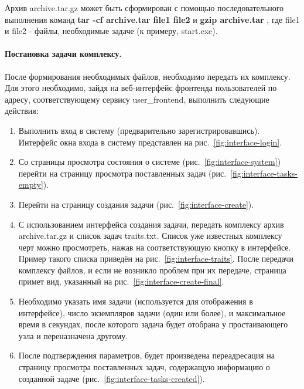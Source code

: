 \documentclass[a4paper,12pt]{report}
\numberwithin{equation}{section}
\begin{document}
  Архив archive.tar.gz может быть сформирован с помощью последовательного выполнения команд
  \textbf{ tar -cf archive.tar file1 file2 } и 
  \textbf{ gzip archive.tar }
  , где file1 и file2 - файлы, необходимые задаче (к примеру, start.exe).
  
  \paragraph{Постановка задачи комплексу.}
  После формирования необходимых файлов, необходимо передать их комплексу.
  Для этого необходимо, зайдя на веб-интерфейс фронтенда пользователей по адресу, соответствующему сервису user\_frontend, выполнить следующие действия:
  
  \begin{enumerate}
    \item Выполнить вход в систему (предварительно зарегистрировавшись). Интерфейс окна входа в систему представлен на рис.~\ref{fig:interface-login}.
    \item Со страницы просмотра состояния о системе (рис.~\ref{fig:interface-system}) перейти на страницу просмотра поставленных задач (рис.~\ref{fig:interface-tasks-empty}).
    \item Перейти на страницу создания задачи (рис.~\ref{fig:interface-create}).
    \item С использованием интерфейса создания задачи, передать комплексу архив archive.tar.gz и список задач traits.txt.
    Список уже известных комплексу черт можно просмотреть, нажав на соответствующую кнопку в интерфейсе.
    Пример такого списка приведён на рис.~\ref{fig:interface-traits}.
    После передачи комплексу файлов, и если не возникло проблем при их передаче, страница примет вид, указанный на рис.~\ref{fig:interface-create-final}.
    \item Необходимо указать имя задачи (используется для отображения в интерфейсе), число экземпляров задачи (один или более), 
    и максимальное время в секундах, после которого задача будет отобрана у простаивающего узла и переназначена другому.
    \item После подтверждения параметров, будет произведена переадресация на страницу просмотра поставленных задач, содержащую информацию о созданной задаче (рис.~\ref{fig:interface-tasks-created}).
  \end{enumerate}
  
\end{document}
